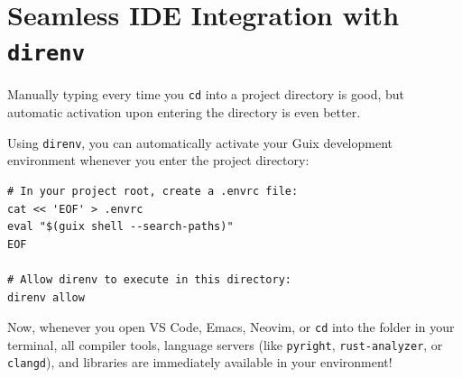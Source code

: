 \section{Seamless IDE Integration with \texttt{direnv}}

Manually typing  every time you \texttt{cd} into a project directory is good, but automatic activation upon entering the directory is even better.

Using \texttt{direnv}, you can automatically activate your Guix development environment whenever you enter the project directory:

\begin{lstlisting}[style=guixcli]
# In your project root, create a .envrc file:
cat << 'EOF' > .envrc
eval "$(guix shell --search-paths)"
EOF

# Allow direnv to execute in this directory:
direnv allow
\end{lstlisting}

Now, whenever you open VS Code, Emacs, Neovim, or \texttt{cd} into the folder in your terminal, all compiler tools, language servers (like \texttt{pyright}, \texttt{rust-analyzer}, or \texttt{clangd}), and libraries are immediately available in your environment!

